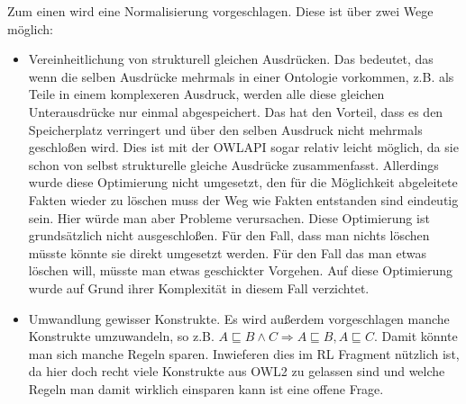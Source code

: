 Zum einen wird eine Normalisierung vorgeschlagen. Diese ist über zwei Wege möglich:
\begin{itemize}
  \item Vereinheitlichung von strukturell gleichen Ausdrücken. Das bedeutet, das wenn die selben Ausdrücke mehrmals in einer Ontologie vorkommen, z.B. als Teile in einem komplexeren Ausdruck, werden alle diese gleichen Unterausdrücke nur einmal abgespeichert. Das hat den Vorteil, dass es den Speicherplatz verringert und über den selben Ausdruck nicht mehrmals geschloßen wird. Dies ist mit der OWLAPI sogar relativ leicht möglich, da sie schon von selbst strukturelle gleiche Ausdrücke zusammenfasst. Allerdings wurde diese Optimierung nicht umgesetzt, den für die Möglichkeit abgeleitete Fakten wieder zu löschen muss der Weg wie Fakten entstanden sind eindeutig sein. Hier würde man aber Probleme verursachen. Diese Optimierung ist grundsätzlich nicht ausgeschloßen. Für den Fall, dass man nichts löschen müsste könnte sie direkt umgesetzt werden. Für den Fall das man etwas löschen will, müsste man etwas geschickter Vorgehen. Auf diese Optimierung wurde auf Grund ihrer Komplexität in diesem Fall verzichtet.
  \item Umwandlung gewisser Konstrukte. Es wird außerdem vorgeschlagen manche Konstrukte umzuwandeln, so z.B. $A \sqsubseteq B \land C \Rightarrow A \sqsubseteq B, A \sqsubseteq C$. Damit könnte man sich manche Regeln sparen. Inwieferen dies im RL Fragment nützlich ist, da hier doch recht viele Konstrukte aus OWL2 zu gelassen sind und welche Regeln man damit wirklich einsparen kann ist eine offene Frage.
\end{itemize}


